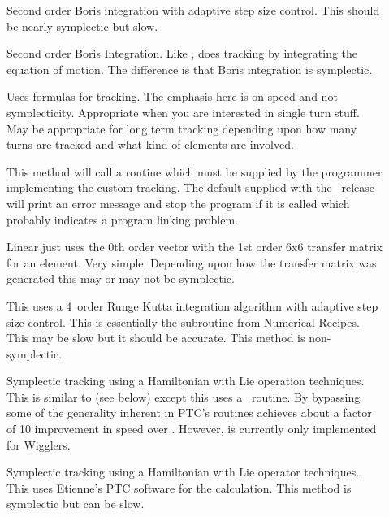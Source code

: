 \begin{description}
\item[]
Second order Boris integration\cite{b:boris} with adaptive step size control.
This should be nearly symplectic but slow.

\item[]
Second order Boris Integration. Like ,  does
tracking by integrating the equation of motion. The difference is that
Boris integration is symplectic.

\item[]
Uses formulas for tracking. The emphasis here is on speed and not
symplecticity. Appropriate when you are interested in single turn
stuff. May be appropriate for long term tracking depending upon how
many turns are tracked and what kind of elements are involved. 

\item[]
This method will call a routine  which must be
supplied by the programmer implementing the custom tracking. The
default  supplied with the \bmad\ release will print
an error message and stop the program if it is called which probably
indicates a program linking problem.

\item[]
Linear just uses the 0th order vector with the 1st order 6x6 transfer
matrix for an element. Very simple.  Depending upon how the transfer
matrix was generated this may or may not be symplectic.

\item[]
This uses a 4\Th\ order Runge Kutta integration algorithm with adaptive
step size control.  This is essentially the  subroutine
from Numerical Recipes\cite{b:nr}. This may be slow but it should be
accurate. This method is non-symplectic.

\item[]
Symplectic tracking using a Hamiltonian with Lie operation techniques.
This is similar to  (see below) except this uses a
\bmad\ routine. By bypassing some of the generality inherent in PTC's routines
 achieves about a factor of 10 improvement in speed over
. However,  is
currently only implemented for Wigglers.

\item[]
Symplectic tracking using a Hamiltonian with Lie operator techniques.
This uses Etienne's PTC software for the calculation. This method is
symplectic but can be slow.


\end{description}
